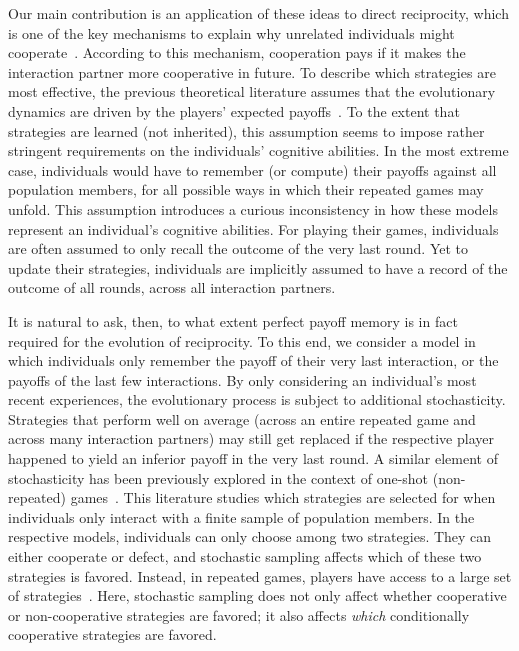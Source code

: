 \documentclass[11pt]{article}
\theoremstyle{plainCl1}
\theoremstyle{plainCl2}
\begin{document}
Our main contribution is an application of these ideas to direct reciprocity, which is one of the key mechanisms to explain why unrelated individuals might cooperate~\citep{nowak:Science:2006}. 
According to this mechanism, cooperation pays if it makes the interaction partner more cooperative in future. 
To describe which strategies are most effective, the previous theoretical literature assumes that the evolutionary dynamics are driven by the players' expected payoffs~\citep{brauchli:JTB:1999,brandt:JTB:2006,ohtsuki:JTB:2007b,szolnoki:pre:2009b,imhof2010stochastic,van-segbroeck:prl:2012,grujic:jtb:2012,Martinez2012,stewart:pnas:2013,pinheiro:PLoSCB:2014,stewart:games:2015,Baek2016,McAvoy:ProcA:2019,glynatsi:SCR:2020,Schmid:PlosCB:2022,Murase:SciRep:2022}.
To the extent that strategies are learned (not inherited), this assumption seems to impose rather stringent requirements on the individuals' cognitive abilities. 
In the most extreme case, individuals would have to remember (or compute) their payoffs against all population members, for all possible ways in which their repeated games may unfold. 
This assumption introduces a curious inconsistency in how these models represent an individual's cognitive abilities. 
For playing their games, individuals are often assumed to only recall the outcome of the very last round. 
Yet to update their strategies, individuals are implicitly assumed to have a record of the outcome of all rounds, across all interaction partners. 

It is natural to ask, then, to what extent perfect payoff memory is in fact required for the evolution of reciprocity. 
To this end, we consider a model in which individuals only remember the payoff of their very last interaction, or the payoffs of the last few interactions. 
By only considering an individual's most recent experiences, the evolutionary process is subject to additional stochasticity. 
Strategies that perform well on average (across an entire repeated game and across many interaction partners) may still get replaced if the respective player happened to yield an inferior payoff in the very last round. 
A similar element of stochasticity has been previously explored in the context of one-shot (non-repeated) games~\citep{sanchez:JTB:2005,roca:PhysicalReview:2006,Traulsen:JTB:2007,Woelfing:JTB:2009,Hauert:PRE:2018}. 
This literature studies which strategies are selected for when individuals only interact with a finite sample of population members. 
In the respective models, individuals can only choose among two strategies. 
They can either cooperate or defect, and stochastic sampling affects which of these two strategies is favored. 
Instead, in repeated games, players have access to a large set of strategies~\citep[in our case, all reactive strategies;][]{nowak:APC:1989}. 
Here, stochastic sampling does not only affect whether cooperative or non-cooperative strategies are favored; it also affects {\it which} conditionally cooperative strategies are favored. 
\end{document}
